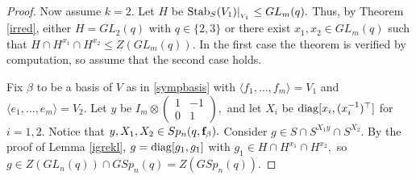 \begin{proof}
 Now assume $k=2.$
Let $H$ be $\mathrm{Stab}_S(V_1)|_{_{V_1}} \le GL_m(q).$ Thus, by Theorem \ref{irred}, either $H=GL_2(q)$ with $q \in \{2,3\}$ or  there exist $x_1, x_2 \in GL_m(q)$ such that $H \cap H^{x_1} \cap H^{x_2} \le Z(GL_m(q)).$ In the first case the theorem is verified by computation, so assume that the second case holds.

Fix $\beta$ to be a basis of $V$ as in \eqref{sympbasis} with $\langle f_1, \ldots, f_m \rangle=V_1$ and $\langle e_1, \ldots, e_m \rangle=V_2$. Let $y$ be $I_m \otimes \left( \begin{smallmatrix} 1& -1\\ 0& 1 \end{smallmatrix} \right),$ and let $X_i$ be $\mathrm{diag}[x_i, (x_i^{-1})^{\top}]$ for $i=1,2.$ Notice that $y, X_1, X_2 \in Sp_n(q,{\bf f}_{\beta}).$ Consider $g \in S \cap S^{X_1 y} \cap S^{X_2}.$ By the proof of Lemma \ref{igrekl}, $g=\mathrm{diag}[g_1,g_1]$ with $g_1 \in H \cap H^{x_1} \cap H^{x_2},$ so $g \in Z(GL_n(q)) \cap GSp_n(q)=Z(GSp_n(q)).$
\end{proof}

